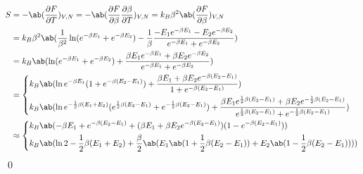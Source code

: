 \documentclass[uplatex,diffipdfmx,a4paper,11pt]{jlreq}
\makeatletter
\numberwithin{equation}{section}
\theoremstyle{definition}
\renewenvironment{proof}[1][\proofname]{\par
  \normalfont
  \topsep6\p@\@plus6\p@ \trivlist
  \item[\hskip\labelsep{\bfseries #1}\@addpunct{\bfseries}]\ignorespaces\quad\par
}{%
  \qed\endtrivlist\@endpefalse
}
\renewcommand\proofname{証明}
\makeatother
\begin{document}
\begin{proof}
\begin{align}
  \end{align}
  \begin{align}
    S & = - \ab(\diffp{F}{T})_{V,N} = - \ab(\diffp{F}{\beta}\diffp{\beta}{T})_{V,N} = k_B\beta^2\ab(\diffp{F}{\beta})_{V,N}                                                                                                                                                                                                                                                                   \\
      & = k_B\beta^2\ab(\frac{1}{\beta^2}\ln(e^{-\beta E_1} + e^{-\beta E_2}) - \frac{1}{\beta}\frac{-E_1e^{-\beta E_1} - E_2e^{-\beta E_2}}{e^{-\beta E_1} + e^{-\beta E_2}})                                                                                                                                                                                                                \\
      & = k_B\ab(\ln(e^{-\beta E_1} + e^{-\beta E_2}) + \frac{\beta E_1e^{-\beta E_1} + \beta E_2e^{-\beta E_2}}{e^{-\beta E_1} + e^{-\beta E_2}})                                                                                                                                                                                                                                            \\
      & = \begin{dcases}
            k_B\ab(\ln e^{-\beta E_1}(1 + e^{-\beta (E_2 - E_1)}) + \frac{\beta E_1 + \beta E_2e^{-\beta (E_2 - E_1)}}{1 + e^{-\beta (E_2 - E_1)}})                                                                                                                                                   \\
            k_B\ab(\ln e^{-\frac{1}{2}\beta (E_1 + E_2)}(e^{\frac{1}{2}\beta (E_2 - E_1)} + e^{-\frac{1}{2}\beta (E_2 - E_1)}) + \frac{\beta E_1e^{\frac{1}{2}\beta (E_2 - E_1)} + \beta E_2e^{-\frac{1}{2}\beta (E_2 - E_1)}}{e^{\frac{1}{2}\beta (E_2 - E_1)} + e^{-\frac{1}{2}\beta (E_2 - E_1)}}) \\
          \end{dcases} \\
      & \approx
    \begin{dcases}
      k_B\ab(-\beta E_1 + e^{-\beta (E_2 - E_1)} + (\beta E_1 + \beta E_2e^{-\beta (E_2 - E_1)})(1 - e^{-\beta (E_2 - E_1)}))                                \\
      k_B\ab(\ln 2 - \frac{1}{2}\beta (E_1 + E_2) + \frac{\beta}{2}\ab(E_1\ab(1 + \frac{1}{2}\beta (E_2 - E_1)) + E_2\ab(1 - \frac{1}{2}\beta (E_2 - E_1)))) \\

\end{dcases}
\end{align}
\end{proof}
\end{document}
